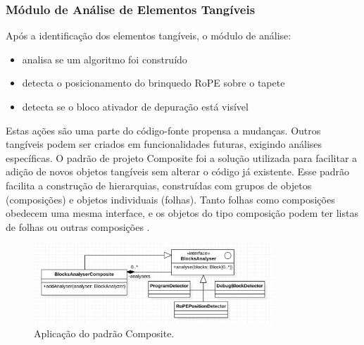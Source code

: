\subsubsection{Módulo de Análise de Elementos Tangíveis}
Após a identificação dos elementos tangíveis, o módulo de análise:

\begin{itemize}
\item analisa se um algoritmo foi construído
\item detecta o posicionamento do brinquedo RoPE sobre o tapete
\item detecta se o bloco ativador de depuração está visível
\end{itemize}

Estas ações são uma parte do código-fonte propensa a mudanças. Outros tangíveis podem ser criados em funcionalidades futuras, exigindo análises específicas. O padrão de projeto Composite foi a solução utilizada para facilitar a adição de novos objetos tangíveis sem alterar o código já existente. Esse padrão facilita a construção de hierarquias, construídas com grupos de objetos (composições) e objetos individuais (folhas). Tanto folhas como composições obedecem uma mesma interface, e os objetos do tipo composição podem ter listas de folhas ou outras composições \cite{gamma_design_1994}.

\begin{figure}
\centering
\includegraphics[width=0.8\textwidth,fbox]{figs/composite_diagram.png}
\caption{Aplicação do padrão Composite.}
\label{fig:composite}
\sourceauthor
\end{figure}

